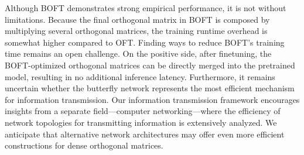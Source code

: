 Although BOFT demonstrates strong empirical performance, it is not without limitations. Because the final orthogonal matrix in BOFT is composed by multiplying several orthogonal matrices, the training runtime overhead is somewhat higher compared to OFT. Finding ways to reduce BOFT’s training time remains an open challenge. On the positive side, after finetuning, the BOFT-optimized orthogonal matrices can be directly merged into the pretrained model, resulting in no additional inference latency. Furthermore, it remains uncertain whether the butterfly network represents the most efficient mechanism for information transmission. Our information transmission framework encourages insights from a separate field—computer networking—where the efficiency of network topologies for transmitting information is extensively analyzed. We anticipate that alternative network architectures may offer even more efficient constructions for dense orthogonal matrices.

